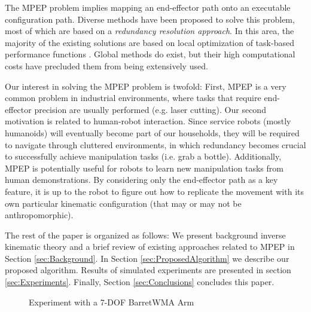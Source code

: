 \documentclass[conference]{IEEEtran}
\begin{document}
The MPEP problem implies mapping an end-effector path onto
an executable configuration path. Diverse methods have been proposed
to solve this problem, most of which are based on a \emph{redundancy
resolution approach}. In this area, the majority of the existing solutions
are based on local optimization of task-based performance functions \cite{hooper-ns-1995}. 
Global methods do exist, but their high computational costs have precluded them
from being extensively used.  

Our interest in solving the MPEP problem is twofold: First, MPEP
is a very common problem in industrial environments, where tasks that require end-effector
precision are usually performed (e.g. laser cutting). Our second motivation is related to
human-robot interaction. Since service robots (mostly humanoids) will eventually become
part of our households, they will be required to navigate through cluttered environments, in which
redundancy becomes crucial to successfully achieve manipulation tasks (i.e. grab a bottle). Additionally, MPEP
is potentially useful for robots to learn new manipulation tasks from human demonstrations. By
considering  only the end-effector path as a key feature, it is up to the robot to figure out how to replicate the movement with
its own particular kinematic configuration (that may or may not be anthropomorphic). 

The rest of the paper is organized as follows: We present background inverse kinematic theory and a brief review
of existing approaches related to MPEP in Section \ref{sec:Background}. In Section \ref{sec:ProposedAlgorithm} we describe our proposed
algorithm. Results of simulated experiments are presented in section \ref{sec:Experiments}. 
Finally, Section \ref{sec:Conclusions} concludes this paper.
\begin{figure}[]
  \centering
  \caption{ Experiment with a 7-DOF BarretWMA Arm}
  \label{fig:CoverFigure}
\end{figure}
\end{document}
